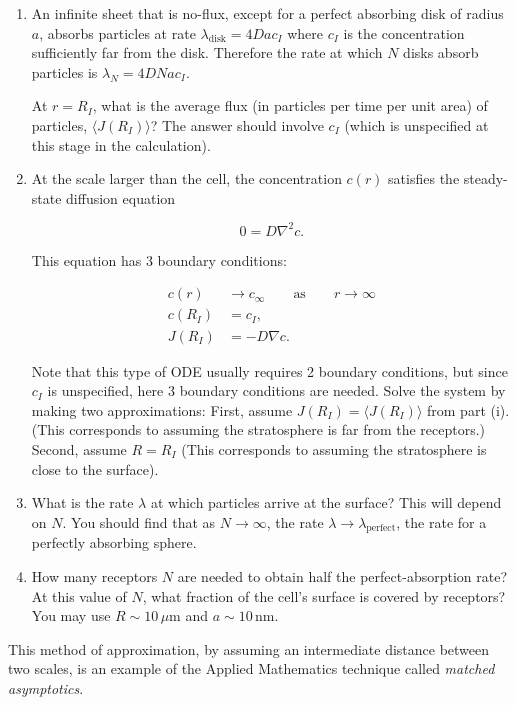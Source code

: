 \documentclass[
  letterpaper,
  DIV=11,
  numbers=noendperiod]{scrartcl}
\begin{document}
\begin{enumerate}
\def\labelenumi{\roman{enumi}.}
\item
  An infinite sheet that is no-flux, except for a perfect absorbing disk of radius \(a\), absorbs particles at rate \(\lambda_\mathrm{disk} = 4D a c_{I}\) where \(c_I\) is the concentration sufficiently far from the disk.
  Therefore the rate at which \(N\) disks absorb particles is \(\lambda_{N} = 4D N a c_{I}\).

  At \(r=R_I\), what is the average flux (in particles per time per unit area) of particles, \(\langle J(R_I)\rangle\)?
  The answer should involve \(c_I\) (which is unspecified at this stage in the calculation).
\item
  At the scale larger than the cell, the concentration \(c(r)\) satisfies the steady-state diffusion equation

  \[
  0 = D \nabla^2 c.
  \]

  This equation has 3 boundary conditions:

  \[
  \begin{aligned}
  c(r) &\rightarrow c_{\infty} \qquad \text{as} \qquad r\rightarrow \infty\\
  c(R_I) &= c_I, \\
  J(R_I) &= - D \nabla c.
  \end{aligned}
  \]

  Note that this type of ODE usually requires 2 boundary conditions, but since \(c_I\) is unspecified, here 3 boundary conditions are needed.
  Solve the system by making two approximations: First, assume \(J(R_I) = \langle J(R_I)\rangle\) from part (i).
  (This corresponds to assuming the stratosphere is far from the receptors.)
  Second, assume \(R=R_I\) (This corresponds to assuming the stratosphere is close to the surface).
\item
  What is the rate \(\lambda\) at which particles arrive at the surface?
  This will depend on \(N\).
  You should find that as \(N\rightarrow\infty\), the rate \(\lambda\rightarrow\lambda_\mathrm{perfect}\), the rate for a perfectly absorbing sphere.
\item
  How many receptors \(N\) are needed to obtain half the perfect-absorption rate?
  At this value of \(N\), what fraction of the cell's surface is covered by receptors?
  You may use \(R \sim 10\,\mu\mathrm{m}\) and \(a \sim 10\,\mathrm{nm}\).
\end{enumerate}

This method of approximation, by assuming an intermediate distance between two scales, is an example of the Applied Mathematics technique called \emph{matched asymptotics}.
\end{document}
